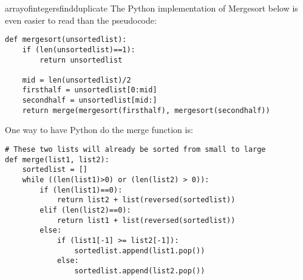 \begin{answer}{arrayofintegersfindduplicate}
The Python implementation of Mergesort below is even easier to read than the pseudocode:
\begin{verbatim}
def mergesort(unsortedlist):
    if (len(unsortedlist)==1):
        return unsortedlist

    mid = len(unsortedlist)/2
    firsthalf = unsortedlist[0:mid]
    secondhalf = unsortedlist[mid:]
    return merge(mergesort(firsthalf), mergesort(secondhalf))
\end{verbatim}
One way to have Python do the merge function is:
\begin{verbatim}
# These two lists will already be sorted from small to large
def merge(list1, list2):
    sortedlist = []
    while ((len(list1)>0) or (len(list2) > 0)):
        if (len(list1)==0):
            return list2 + list(reversed(sortedlist))
        elif (len(list2)==0):
            return list1 + list(reversed(sortedlist))
        else:
            if (list1[-1] >= list2[-1]):
                sortedlist.append(list1.pop())
            else:
                sortedlist.append(list2.pop())

\end{verbatim}
\end{answer}
